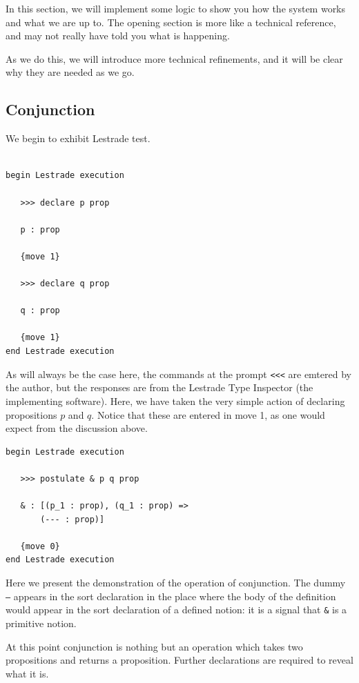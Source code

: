 \documentclass[12pt]{article}
\begin{document}
In this section, we will implement some logic to show you how the system works and what we are up to.  The opening section is more like a technical reference, and may not really have told you what is happening.

As we do this, we will introduce more technical refinements, and it will be clear why they are needed as we go.

\subsection{Conjunction}

We begin to exhibit Lestrade test.

\begin{verbatim}

begin Lestrade execution

   >>> declare p prop

   p : prop

   {move 1}

   >>> declare q prop

   q : prop

   {move 1}
end Lestrade execution

\end{verbatim}
As will always be the case here, the commands at the prompt {\tt <<<} are emtered by the author, but the responses are from the Lestrade Type Inspector (the implementing software).   Here, we have taken the very simple action of declaring propositions $p$ and $q$.  Notice that these are entered in move 1, as one would expect from the discussion above.

\begin{verbatim}
begin Lestrade execution

   >>> postulate & p q prop

   & : [(p_1 : prop), (q_1 : prop) => 
       (--- : prop)]

   {move 0}
end Lestrade execution
\end{verbatim}

Here we present the demonstration of the operation of conjunction.  The dummy {\tt ---} appears in the sort declaration in the place where the body of the definition would appear in the sort declaration of a defined notion:  it is a signal that {\tt \&} is a primitive notion.

At this point conjunction is nothing but an operation which takes two propositions and returns a proposition.  Further declarations are required to reveal what it is.
\end{document}
